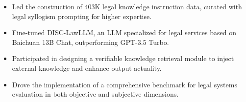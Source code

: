 


\begin{itemize}[nosep]
  \item Led the construction of 403K legal knowledge instruction data, curated with legal syllogism prompting for higher expertise.
  \item Fine-tuned DISC-LawLLM, an LLM specialized for legal services based on Baichuan 13B Chat, outperforming GPT-3.5 Turbo.
  \item Participated in designing a verifiable knowledge retrieval module to inject external knowledge and enhance output actuality.
  \item Drove the implementation of a comprehensive benchmark for legal systems evaluation in both objective and subjective dimensions.
\end{itemize}
